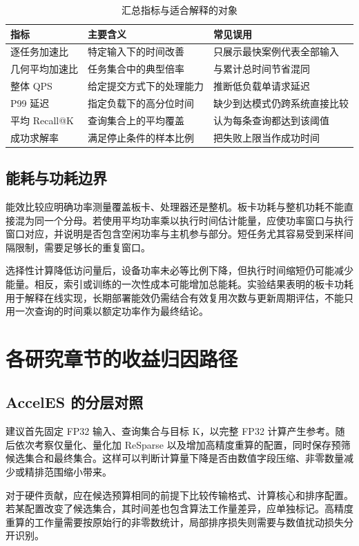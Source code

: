 \begin{table}[htbp]\centering\caption{汇总指标与适合解释的对象}
\begin{tabularx}{\textwidth}{p{3cm}XX}\toprule
指标&主要含义&常见误用\\\midrule
逐任务加速比&特定输入下的时间改善&只展示最快案例代表全部输入\\
几何平均加速比&任务集合中的典型倍率&与累计总时间节省混同\\
整体 QPS&给定提交方式下的处理能力&推断低负载单请求延迟\\
P99 延迟&指定负载下的高分位时间&缺少到达模式仍跨系统直接比较\\
平均 Recall@K&查询集合上的平均覆盖&认为每条查询都达到该阈值\\
成功求解率&满足停止条件的样本比例&把失败上限当作成功时间\\\bottomrule
\end{tabularx}\end{table}

\subsection{能耗与功耗边界}
能效比较应明确功率测量覆盖板卡、处理器还是整机。板卡功耗与整机功耗不能直接混为同一个分母。若使用平均功率乘以执行时间估计能量，应使功率窗口与执行窗口对应，并说明是否包含空闲功率与主机参与部分。短任务尤其容易受到采样间隔限制，需要足够长的重复窗口。

选择性计算降低访问量后，设备功率未必等比例下降，但执行时间缩短仍可能减少能量。相反，索引或训练的一次性成本可能增加总能耗。实验结果表明的板卡功耗用于解释在线实现，长期部署能效仍需结合有效复用次数与更新周期评估，不能只用一次查询的时间乘以额定功率作为最终结论。

\section{各研究章节的收益归因路径}
\subsection{AccelES 的分层对照}
建议首先固定 FP32 输入、查询集合与目标 K，以完整 FP32 计算产生参考。随后依次考察仅量化、量化加 ReSparse 以及增加高精度重算的配置，同时保存预筛候选集合和最终集合。这样可以判断计算量下降是否由数值字段压缩、非零数量减少或精排范围缩小带来。

对于硬件贡献，应在候选预算相同的前提下比较传输格式、计算核心和排序配置。若某配置改变了候选集合，其时间差也包含算法工作量差异，应单独标记。高精度重算的工作量需要按原始行的非零数统计，局部排序损失则需要与数值扰动损失分开识别。

